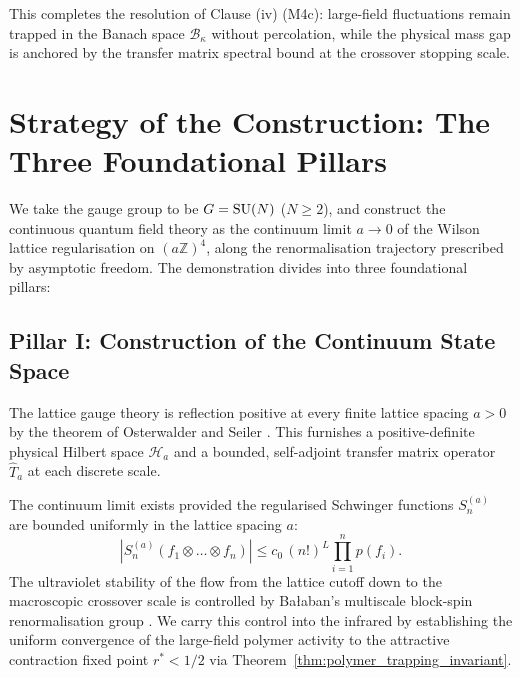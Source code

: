 This completes the resolution of Clause (iv) (M4c): large-field fluctuations remain trapped in the Banach space $\mathcal{B}_\kappa$ without percolation, while the physical mass gap is anchored by the transfer matrix spectral bound at the crossover stopping scale.


\section{Strategy of the Construction: The Three Foundational Pillars}
\label{sec:strategy}

We take the gauge group to be $G = \mathrm{SU}(N)$ ($N \ge 2$), and construct the continuous quantum field theory as the continuum limit $a \to 0$ of the Wilson lattice regularisation on $(a \mathbb{Z})^4$, along the renormalisation trajectory prescribed by asymptotic freedom. The demonstration divides into three foundational pillars:

\subsection{Pillar I: Construction of the Continuum State Space}
\label{subsec:pillar_I}
The lattice gauge theory is reflection positive at every finite lattice spacing $a > 0$ by the theorem of Osterwalder and Seiler \cite{OsterwalderSeiler1978}. This furnishes a positive-definite physical Hilbert space $\mathcal{H}_a$ and a bounded, self-adjoint transfer matrix operator $\hat{T}_a$ at each discrete scale.

The continuum limit exists provided the regularised Schwinger functions $S_n^{(a)}$ are bounded uniformly in the lattice spacing $a$:
\begin{equation}
\left| S_n^{(a)}(f_1 \otimes \dots \otimes f_n) \right| \le c_0 \, (n!)^L \prod_{i=1}^n p(f_i).
\end{equation}
The ultraviolet stability of the flow from the lattice cutoff down to the macroscopic crossover scale is controlled by Ba\l aban's multiscale block-spin renormalisation group \cite{Balaban1984, Balaban1985}. We carry this control into the infrared by establishing the uniform convergence of the large-field polymer activity to the attractive contraction fixed point $r^* < 1/2$ via Theorem~\ref{thm:polymer_trapping_invariant}.

